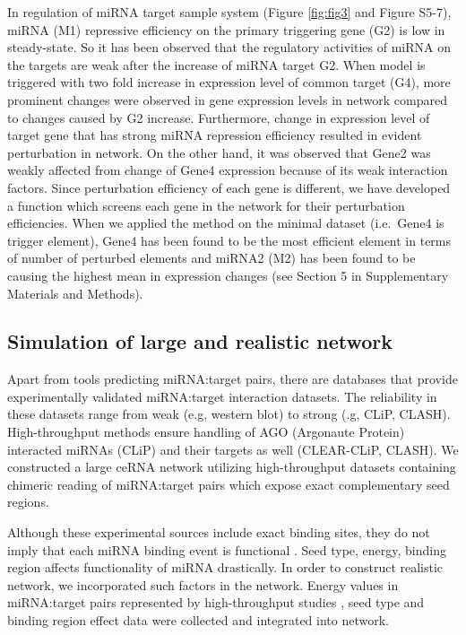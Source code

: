 \documentclass[a4,center,fleqn]{NAR}
\begin{document}
In regulation of miRNA target sample system (Figure \ref{fig:fig3} and
Figure S5-7), miRNA (M1) repressive efficiency on the primary triggering
gene (G2) is low in steady-state. So it has been observed that the
regulatory activities of miRNA on the targets are weak after the
increase of miRNA target G2. When model is triggered with two fold
increase in expression level of common target (G4), more prominent
changes were observed in gene expression levels in network compared to
changes caused by G2 increase. Furthermore, change in expression level
of target gene that has strong miRNA repression efficiency resulted in
evident perturbation in network. On the other hand, it was observed that
Gene2 was weakly affected from change of Gene4 expression because of its
weak interaction factors. Since perturbation efficiency of each gene is
different, we have developed a function which screens each gene in the
network for their perturbation efficiencies. When we applied the method
on the minimal dataset (i.e.~Gene4 is trigger element), Gene4 has been
found to be the most efficient element in terms of number of perturbed
elements and miRNA2 (M2) has been found to be causing the highest mean
in expression changes (see Section 5 in Supplementary Materials and
Methods).

\subsection{Simulation of large and realistic network}

Apart from tools predicting miRNA:target pairs, there are databases that
provide experimentally validated miRNA:target interaction datasets. The
reliability in these datasets range from weak (e.g, western blot) to
strong (.g, CLiP, CLASH). High-throughput methods ensure handling of AGO
(Argonaute Protein) interacted miRNAs (CLiP) and their targets as well
(CLEAR-CLiP, CLASH). We constructed a large ceRNA network utilizing
high-throughput datasets containing chimeric reading of miRNA:target
pairs \citep{helwak_mapping_2013, moore_mirnatarget_2015} which expose
exact complementary seed regions.

Although these experimental sources include exact binding sites, they do
not imply that each miRNA binding event is functional
\citep{liu2019prediction}. Seed type, energy, binding region affects
functionality of miRNA drastically. In order to construct realistic
network, we incorporated such factors in the network. Energy values in
miRNA:target pairs represented by high-throughput studies
\citep{helwak_mapping_2013, moore_mirnatarget_2015}, seed type
\citep{grimson_microrna_2007, bartel_micrornas:_2009, betel2010comprehensive}
and binding region effect
\citep{hausser_analysis_2013, helwak_mapping_2013} data were collected
and integrated into network.
\end{document}
